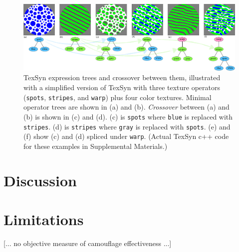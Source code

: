 \documentclass[sigconf]{acmart}
\begin{document}
\begin{figure}
    \includegraphics[width=\textwidth]{images/texsyn_overview.pdf}
    \caption{TexSyn expression trees and crossover between them, illustrated with a simplified version of TexSyn with three texture operators (\texttt{spots}, \texttt{stripes}, and \texttt{warp}) plus four color textures. Minimal operator trees are shown in (a) and (b). \textit{Crossover} between (a) and (b) is shown in (c) and (d). (c) is \texttt{spots} where \texttt{blue} is replaced with \texttt{stripes}. (d) is \texttt{stripes} where \texttt{gray} is replaced with \texttt{spots}. (e) and (f) show (c) and (d) spliced under \texttt{warp}. (Actual TexSyn c++ code for these examples in Supplemental Materials.)}
    \label{fig:TexSyn_overview}
\end{figure}


\section{Discussion}

\section{Limitations}
[... no objective measure of camouflage effectiveness ...]
\par
[... all results are hand selected, “cherry picked” ...] 
\par
[... cite that fast growing literature on “camouflaged object detection” ...]
\par
[... propose a crowd sourced user study of camouflage quality ... could be based on time to find ... like the interactive web games of \href{https://www.visual-ecology.com/2020/10/06/martin-stevens/}{Martin Stevens} nuthatch egg? ...] 
\par
[... in email to Ken I wrote: \textit{The aspect of my project I'm unsure how to approach is lack of rigor. My evaluations are all subjective. It comes down to “we can see that the effectiveness of the camouflage clearly increases during the simulation.”}]
\par
[... inherently 2d ...]
\par
[... texture synthesis lacks genetic or biological plausibility ...]
\end{document}

